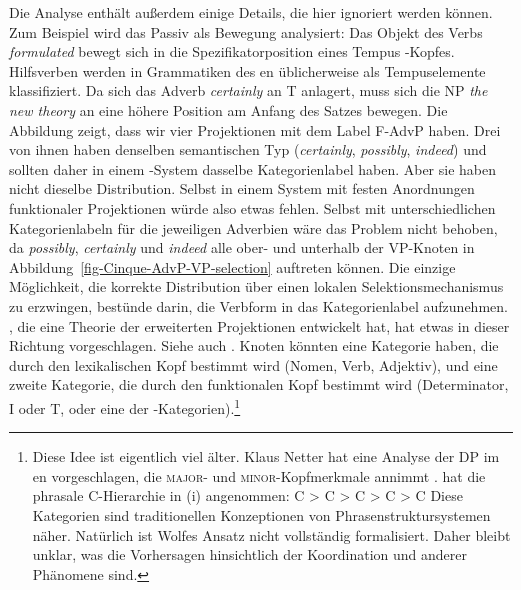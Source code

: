 Die Analyse enthält außerdem einige Details, die hier ignoriert werden können. Zum Beispiel wird das Passiv als
Bewegung analysiert: Das Objekt des Verbs \emph{formulated} bewegt sich in die Spezifikatorposition eines Tempus%
-Kopfes. Hilfsverben werden in Grammatiken des en üblicherweise als Tempuselemente klassifiziert. Da sich das Adverb
\emph{certainly} an T anlagert, muss sich die NP \emph{the new theory} an eine höhere Position am
Anfang des Satzes bewegen. Die Abbildung zeigt, dass wir vier Projektionen mit dem Label F-AdvP haben. Drei
von ihnen haben denselben semantischen Typ (\emph{certainly}, \emph{possibly}, \emph{indeed}) und sollten daher
in einem
\citeauthor{CR2010a}-System dasselbe Kategorienlabel haben. Aber sie haben nicht dieselbe Distribution. Selbst in einem System mit
festen Anordnungen funktionaler Projektionen würde also etwas fehlen.
Selbst mit unterschiedlichen Kategorienlabeln für die jeweiligen Adverbien wäre das Problem nicht behoben, da
\emph{possibly}, \emph{certainly} und \emph{indeed} alle ober- und unterhalb der VP-Knoten in
Abbildung~\ref{fig-Cinque-AdvP-VP-selection} auftreten können. Die einzige Möglichkeit, die korrekte Distribution über einen lokalen
Selektionsmechanismus zu erzwingen, bestünde darin, die Verbform in das Kategorienlabel aufzunehmen. \citet{Grimshaw2000a},
die eine Theorie der erweiterten Projektionen entwickelt hat, hat etwas in dieser Richtung vorgeschlagen. Siehe auch . Knoten könnten eine
Kategorie haben, die durch den lexikalischen Kopf bestimmt wird (Nomen, Verb, Adjektiv), und eine zweite Kategorie,
die durch den funktionalen Kopf bestimmt wird (Determinator, I oder T, oder eine der \citeauthor{CR2010a}%
-Kategorien).\footnote{
Diese Idee ist eigentlich viel älter. Klaus Netter hat eine Analyse der DP im en vorgeschlagen, die
\textsc{major}- und \textsc{minor}-Kopfmerkmale annimmt \citep[Abschnitt~9.3.1]{Netter94}.
\textcites[]{Wolfe2015a-u}[]{Wolfe2016a-u} hat die phrasale C-Hierarchie in (i) angenommen:
\ea
C > C > C > C > C
\z
Diese Kategorien sind traditionellen Konzeptionen von Phrasenstruktursystemen näher. Natürlich ist Wolfes
Ansatz nicht vollständig formalisiert. Daher bleibt unklar, was die Vorhersagen hinsichtlich der
Koordination und anderer Phänomene sind.
}

